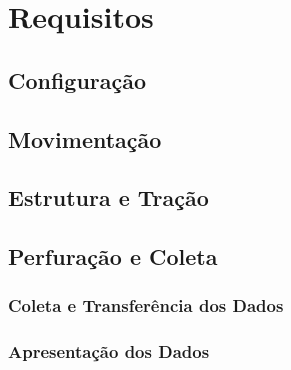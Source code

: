 \chapter{Requisitos}
  \section{Configuração}

  \section{Movimentação}

  \section{Estrutura e Tração}

  \section{Perfuração e Coleta}
    \subsection{Coleta e Transferência dos Dados}
    \subsection{Apresentação dos Dados}
